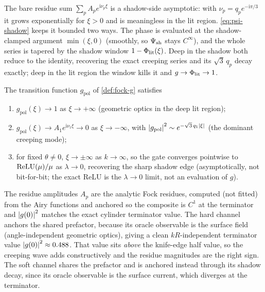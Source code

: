 \begin{remark}\label{rem:windowing}
The bare residue sum $\sum_p A_p e^{\mathrm{i}\nu_p\xi}$ is a shadow-side
asymptotic: with $\nu_p=q_p e^{-\mathrm{i}\pi/3}$ it grows exponentially for
$\xi>0$ and is meaningless in the lit region. \cref{eq:psi-shadow} keeps it
bounded two ways. The phase is evaluated at the shadow-clamped argument
$\min(\xi,0)$ (smoothly, so $\Psi_{\mathrm{sh}}$ stays $C^\infty$), and the whole series is
tapered by the shadow window $1-\Phi_{\mathrm{lit}}(\xi)$. Deep in the shadow both reduce to
the identity, recovering the exact creeping series and its $\sqrt3\,q_p$ decay
exactly; deep in the lit region the window kills it and $g\to\Phi_{\mathrm{lit}}\to 1$.
\end{remark}

\begin{proposition}\label{prop:fock-limits}
The transition function $g_{\mathrm{pol}}$ of \cref{def:fock-g} satisfies
\begin{enumerate}
  \item $g_{\mathrm{pol}}(\xi)\to 1$ as $\xi\to+\infty$ (geometric optics in the
        deep lit region);
  \item $g_{\mathrm{pol}}(\xi)\to A_1 e^{\mathrm{i}\nu_1\xi}\to 0$ as
        $\xi\to-\infty$, with $\abs{g_{\mathrm{pol}}}^2\sim
        e^{-\sqrt3\,q_1\abs{\xi}}$ (the dominant creeping mode);
  \item for fixed $\theta\ne 0$, $\xi\to\pm\infty$ as $k\to\infty$, so the gate
        converges pointwise to $\operatorname{ReLU}(\mu)/\mu$ as $\lambda\to 0$, recovering the
        sharp shadow edge (asymptotically, not bit-for-bit; the exact ReLU is the
        $\lambda\to 0$ limit, not an evaluation of $g$).
\end{enumerate}
\end{proposition}

The residue amplitudes $A_p$ are the analytic Fock residues, computed (not
fitted) from the Airy functions and anchored so the composite is $C^1$ at the
terminator and $\abs{g(0)}^2$ matches the exact cylinder terminator value. The
hard channel anchors the shared prefactor, because its oracle observable is the
surface field (angle-independent geometric optics), giving a clean
$kR$-independent terminator value $\abs{g(0)}^2\approx 0.488$. That value sits
\emph{above} the knife-edge half value, so the creeping wave adds constructively
and the residue magnitudes are the right sign. The soft channel shares the
prefactor and is anchored instead through its shadow decay, since its oracle
observable is the surface current, which diverges at the terminator.

